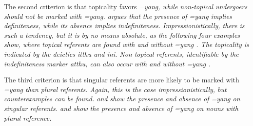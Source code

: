 The second criterion is that topicality favors \em =yang\em, while non-topical undergoers should not be marked with \em =yang\em. \citet{Ansaldo2008genesis,Ansaldo2009book} argues that the presence of \em =yang \em implies definiteness, while its absence implies indefiniteness. Impressionistically, there is such a tendency, but it is by no means absolute, as the following four examples show, where topical referents are found with  and without \em =yang \em {}. The topicality is indicated by the deictics \em itthu \em and \em ini\em. Non-topical referents, identifiable by the indefiniteness marker \em atthu, \em can also occur with  and without \em =yang \em {}.
 






The third criterion is that singular referents are more likely to be marked with \em =yang \em than plural referents. Again, this is the case impressionistically, but counterexamples can be found.  and  show the presence and absence of \em =yang \em on singular referents.  and  show the presence and absence of \em =yang \em on nouns with plural reference.


